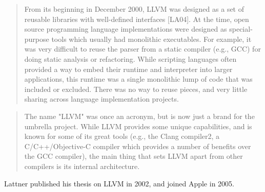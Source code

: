 \begin{quotation}
From its beginning in December 2000, LLVM was designed as a set of reusable 
libraries with well-defined interfaces [LA04]. At the time, open source 
programming language implementations were designed as special-purpose tools 
which usually had monolithic executables. For example, it was very difficult to 
reuse the parser from a static compiler (e.g., GCC) for doing static analysis 
or refactoring. While scripting languages often provided a way to embed their 
runtime and interpreter into larger applications, this runtime was a single 
monolithic lump of code that was included or excluded. There was no way to 
reuse pieces, and very little sharing across language implementation projects.
\cite{aosa_vol1}
\end{quotation}

\begin{quotation}
The name "LLVM" was once an acronym, but is now just a brand for the umbrella 
project. While LLVM provides some unique capabilities, and is known for some of 
its great tools (e.g., the Clang compiler2, a C/C++/Objective-C compiler which 
provides a number of benefits over the GCC compiler), the main thing that sets 
LLVM apart from other compilers is its internal architecture.
\cite[LLVM]{aosa_vol1}
\end{quotation}

Lattner published his thesis on LLVM in 2002, and joined Apple in 2005.

\pagebreak

